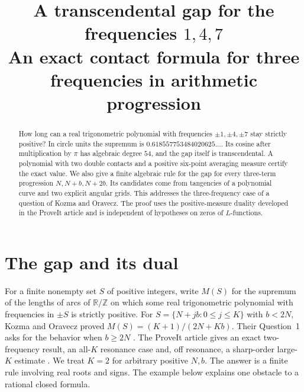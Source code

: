 \documentclass[10pt]{article}
\title{A transcendental gap for the frequencies $1,4,7$\\[3pt]
\large An exact contact formula for three frequencies in arithmetic progression}
\author{}\date{}
\newcommand{\R}{\mathbb R}
\newcommand{\Z}{\mathbb Z}
\begin{document}
\maketitle\vspace{-2.3em}
\begin{abstract}
How long can a real trigonometric polynomial with frequencies $\pm1,\pm4,\pm7$ stay strictly positive? In circle units the supremum is $0.618557753484020625\ldots$. Its cosine after multiplication by $\pi$ has algebraic degree $54$, and the gap itself is transcendental. A polynomial with two double contacts and a positive six-point averaging measure certify the exact value. We also give a finite algebraic rule for the gap for every three-term progression $N,N+b,N+2b$. Its candidates come from tangencies of a polynomial curve and two explicit angular grids. This addresses the three-frequency case of a question of Kozma and Oravecz. The proof uses the positive-measure duality developed in the ProveIt article and is independent of hypotheses on zeros of $L$-functions.
\end{abstract}

\section{The gap and its dual}
For a finite nonempty set $S$ of positive integers, write $M(S)$ for the supremum of the lengths of arcs of $\R/\Z$ on which some real trigonometric polynomial with frequencies in $\pm S$ is strictly positive. For $S=\{N+jb:0\le j\le K\}$ with $b<2N$, Kozma and Oravecz proved $M(S)=(K+1)/(2N+Kb)$. Their Question~1 asks for the behavior when $b\ge 2N$ \cite{KO}. The ProveIt article gives an exact two-frequency result, an all-$K$ resonance case and, off resonance, a sharp-order large-$K$ estimate \cite{repo}. We treat $K=2$ for arbitrary positive $N,b$. The answer is a finite rule involving real roots and signs. The example below explains one obstacle to a rational closed formula.
\end{document}
